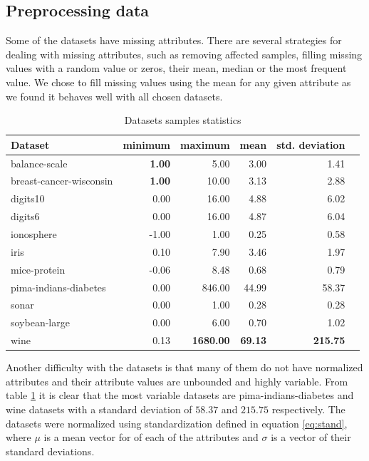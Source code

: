 \documentclass[12pt,a4paper]{report}
\begin{document}
\subsection{Preprocessing data} \label{chap:exp:preprocessing}
Some of the datasets have missing attributes. There are several strategies for dealing with missing attributes, such as removing affected samples, filling missing values with a random value or zeros, their mean, median or the most frequent value. We chose to fill missing values using the mean for any given attribute as we found it behaves well with all chosen datasets.

\begin{table}[ht] \centering
\begin{tabular}{lrrrrr}
\hline
Dataset & minimum & maximum & mean & std. deviation \\
\hline
balance-scale           & \textbf{1.00}  & 5.00    & 3.00  & 1.41 \\
breast-cancer-wisconsin & \textbf{1.00}  & 10.00   & 3.13  & 2.88 \\
digits10                & 0.00  & 16.00   & 4.88  & 6.02 \\
digits6                 & 0.00  & 16.00   & 4.87  & 6.04 \\
ionosphere              & -1.00 & 1.00    & 0.25  & 0.58 \\
iris                    & 0.10  & 7.90    & 3.46  & 1.97 \\
mice-protein            & -0.06 & 8.48    & 0.68  & 0.79 \\
pima-indians-diabetes   & 0.00  & 846.00  & 44.99 & 58.37 \\
sonar                   & 0.00  & 1.00    & 0.28  & 0.28 \\
soybean-large           & 0.00  & 6.00    & 0.70  & 1.02 \\
wine                    & 0.13  & \textbf{1680.00} & \textbf{69.13} & \textbf{215.75} \\
\hline
\end{tabular}
\caption{Datasets samples statistics} \label{tab:datasets-samples}
\end{table}


Another difficulty with the datasets is that many of them do not have normalized attributes and their attribute values are unbounded and highly variable. From table \ref{tab:datasets-samples} it is clear that the most variable datasets are pima-indians-diabetes and wine datasets with a standard deviation of $58.37$ and $215.75$ respectively. The datasets were normalized using standardization defined in equation \ref{eq:stand}, where $\mu$ is a mean vector for of each of the attributes and $\sigma$ is a vector of their standard deviations.
\end{document}
